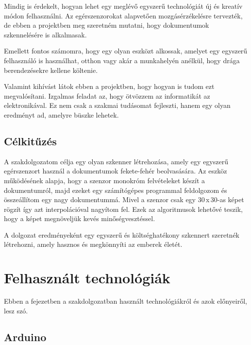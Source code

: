 \documentclass[]{thesis-ekf}
\theoremstyle{definition}
\theoremstyle{remark}
\begin{document}
	Mindig is érdekelt, hogyan lehet egy meglévő egyszerű technológiát új és kreatív módon felhasználni. Az egérszenzorokat alapvetően mozgásérzékelésre tervezték, de ebben a projektben meg szeretném mutatni, hogy dokumentumok szkennelésére is alkalmasak.
	
	Emellett fontos számomra, hogy egy olyan eszközt alkossak, amelyet egy egyszerű felhasználó is használhat, otthon vagy akár a munkahelyén anélkül, hogy drága berendezésekre kellene költenie. 
	
	Valamint kihívást látok ebben a projektben, hogy hogyan is tudom ezt megvalósítani. Izgalmas feladat az, hogy ötvözzem az informatikát az elektronikával. Ez nem csak a szakmai tudásomat fejleszti, hanem egy olyan eredményt ad, amelyre büszke lehetek.
	\section{Célkitűzés}
	A szakdolgozatom\cite{szakdolgozat} célja egy olyan szkenner létrehozása, amely egy egyszerű egérszenzort használ a dokumentumok fekete-fehér beolvasására. Az eszköz működésének alapja, hogy a szenzor monokróm felvételeket készít a dokumentumról, majd ezeket egy számítógépes programmal feldolgozom és összeállítom egy nagy dokumentummá. Mivel a szenzor csak egy 30\,x\,30-as képet rögzít így azt interpolációval nagyítom fel. Ezek az algoritmusok lehetővé teszik, hogy a képet megnöveljük kevés minőségvesztéssel. 
	
	A dolgozat eredményeként egy egyszerű és költséghatékony szkennert szeretnék létrehozni, amely hasznos és megkönnyíti az emberek életét.
	\chapter{Felhasznált technológiák}
	Ebben a fejezetben a szakdolgozatban használt technológiákról és azok előnyeiről, lesz szó.
	\section{Arduino}
\end{document}
